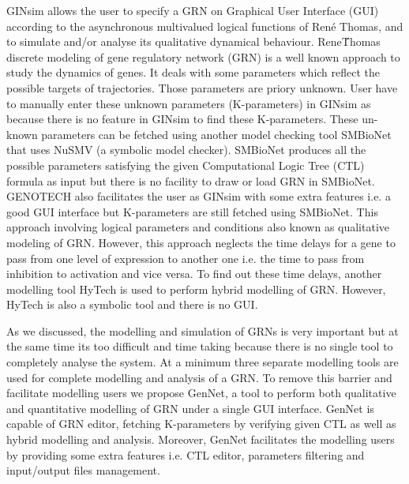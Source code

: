 \documentclass[twocolumn]{bmcart}%
\begin{document}
\par GINsim allows the user to specify a GRN on Graphical User Interface (GUI) according to the asynchronous multivalued logical functions of René Thomas, and to simulate and/or analyse its qualitative dynamical behaviour. Rene\'  Thomas discrete modeling of gene regulatory network (GRN) \cite{GUY} is  a well known approach to study the dynamics of genes. It deals with some parameters which reflect the possible targets of trajectories. Those parameters are priory unknown. User have to manually enter these unknown parameters (K-parameters) in GINsim as because there is no feature in GINsim to find these K-parameters. These un-known parameters can be fetched using another model checking tool SMBioNet\cite{SMB} that uses NuSMV (a symbolic model checker). SMBioNet produces all the possible parameters satisfying the given Computational Logic Tree (CTL) formula as input but there is no facility to draw or load GRN in SMBioNet. GENOTECH also facilitates the user as GINsim with some extra features i.e. a good GUI interface but K-parameters are still fetched using SMBioNet. This approach involving logical parameters and conditions also known as qualitative modeling of GRN. However, this approach neglects the time delays for a gene to pass from one level of expression to another one i.e. the time to pass from inhibition to activation and vice versa. To find out these time delays, another modelling tool HyTech\cite{HTK} is used to perform hybrid modelling of GRN. However, HyTech is also a symbolic tool and there is no GUI.
\par As we discussed, the modelling and simulation of GRNs is very important but at the same time its too difficult and time taking because there is no single tool to completely analyse the system. At a minimum three separate modelling tools are used for complete modelling and analysis of a GRN. To remove this barrier and facilitate modelling users we propose GenNet, a tool to perform both qualitative and quantitative modelling of GRN under a single GUI interface. GenNet is capable of GRN editor, fetching K-parameters by verifying given CTL as well as hybrid modelling and analysis. Moreover, GenNet facilitates the modelling users by providing some extra features i.e. CTL editor, parameters filtering and input/output files management.
\end{document}
